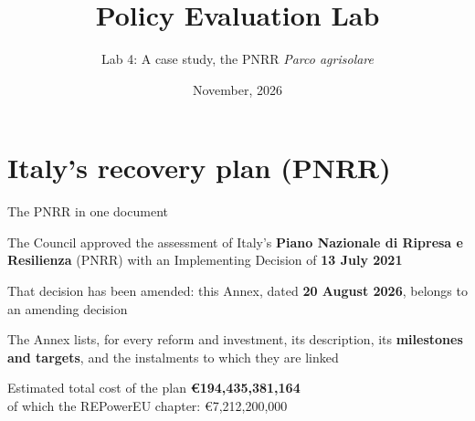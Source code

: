 \documentclass[aspectratio=169,xcolor=table]{beamer}
\title[Policy Evaluation Lab]{Policy Evaluation Lab}
\subtitle[Lab 4]{Lab 4: A case study, the PNRR \textit{Parco agrisolare}}
\date[\pelYear]{November, 2026}
\begin{document}
\frame{\titlepage}

\section{Italy's recovery plan (PNRR)}

\begin{frame}{The PNRR in one document}
\bi
  \item The Council approved the assessment of Italy's \textbf{Piano Nazionale di Ripresa e Resilienza} (PNRR) with an Implementing Decision of \textbf{13 July 2021}
  \item That decision has been amended: this Annex, dated \textbf{20 August 2026}, belongs to an amending decision
  \item The Annex lists, for every reform and investment, its description, its \textbf{milestones and targets}, and the instalments to which they are linked
\ei
\vspace{0.15cm}
\begin{block}{Estimated total cost of the plan}
\centering \textbf{€194,435,381,164}\\[2pt]
\small of which the REPowerEU chapter: €7,212,200,000
\end{block}
\end{frame}
\end{document}
